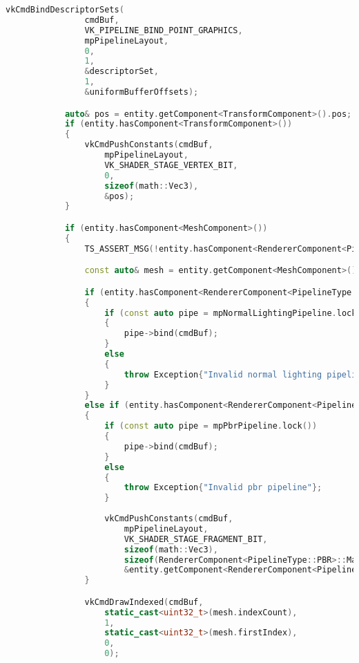 \begin{itemize}
\begin{lstlisting}[language=c++, caption=Front-end of the rendrer (./engine/src/ecs/systems/render\_system.hpp)]
            vkCmdBindDescriptorSets(
                cmdBuf,
                VK_PIPELINE_BIND_POINT_GRAPHICS,
                mpPipelineLayout,
                0,
                1,
                &descriptorSet,
                1,
                &uniformBufferOffsets);

            auto& pos = entity.getComponent<TransformComponent>().pos;
            if (entity.hasComponent<TransformComponent>())
            {
                vkCmdPushConstants(cmdBuf,
                    mpPipelineLayout,
                    VK_SHADER_STAGE_VERTEX_BIT,
                    0,
                    sizeof(math::Vec3),
                    &pos);
            }

            if (entity.hasComponent<MeshComponent>())
            {
                TS_ASSERT_MSG(!entity.hasComponent<RendererComponent<PipelineType::COLOR>>(), "Not implemented yet");

                const auto& mesh = entity.getComponent<MeshComponent>();

                if (entity.hasComponent<RendererComponent<PipelineType::NORMAL_LIGHTING>>())
                {
                    if (const auto pipe = mpNormalLightingPipeline.lock())
                    {
                        pipe->bind(cmdBuf);
                    }
                    else
                    {
                        throw Exception{"Invalid normal lighting pipeline"};
                    }
                }
                else if (entity.hasComponent<RendererComponent<PipelineType::PBR>>())
                {
                    if (const auto pipe = mpPbrPipeline.lock())
                    {
                        pipe->bind(cmdBuf);
                    }
                    else
                    {
                        throw Exception{"Invalid pbr pipeline"};
                    }
                
                    vkCmdPushConstants(cmdBuf,
                        mpPipelineLayout,
                        VK_SHADER_STAGE_FRAGMENT_BIT,
                        sizeof(math::Vec3),
                        sizeof(RendererComponent<PipelineType::PBR>::Material),
                        &entity.getComponent<RendererComponent<PipelineType::PBR>>().material);
                }

                vkCmdDrawIndexed(cmdBuf,
                    static_cast<uint32_t>(mesh.indexCount),
                    1,
                    static_cast<uint32_t>(mesh.firstIndex),
                    0,
                    0);


\end{lstlisting}
\end{itemize}
